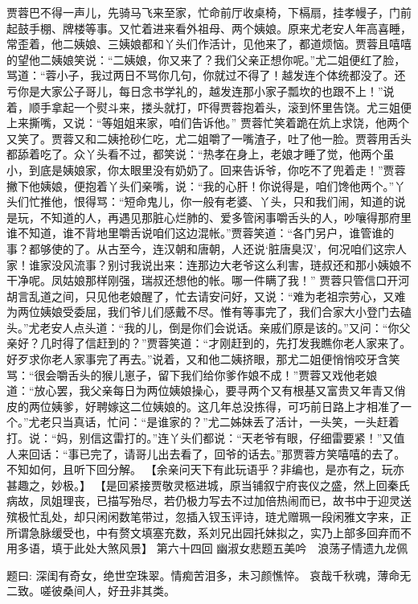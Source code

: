 \documentclass[12pt,oneside]{book}
\begin{document}
贾蓉巴不得一声儿，先骑马飞来至家，忙命前厅收桌椅，下槅扇，挂孝幔子，门前起鼓手棚、牌楼等事。又忙着进来看外祖母、两个姨娘。原来尤老安人年高喜睡，常歪着，他二姨娘、三姨娘都和丫头们作活计，见他来了，都道烦恼。贾蓉且嘻嘻的望他二姨娘笑说：“二姨娘，你又来了？我们父亲正想你呢。”尤二姐便红了脸，骂道：“蓉小子，我过两日不骂你几句，你就过不得了！越发连个体统都没了。还亏你是大家公子哥儿，每日念书学礼的，越发连那小家子瓢坎的也跟不上！”说着，顺手拿起一个熨斗来，搂头就打，吓得贾蓉抱着头，滚到怀里告饶。尤三姐便上来撕嘴，又说：“等姐姐来家，咱们告诉他。”
贾蓉忙笑着跪在炕上求饶，他两个又笑了。贾蓉又和二姨抢砂仁吃，尤二姐嚼了一嘴渣子，吐了他一脸。贾蓉用舌头都舔着吃了。众丫头看不过，都笑说：“热孝在身上，老娘才睡了觉，他两个虽小，到底是姨娘家，你太眼里没有奶奶了。回来告诉爷，你吃不了兜着走！”贾蓉撇下他姨娘，便抱着丫头们亲嘴，说：“我的心肝！你说得是，咱们馋他两个。”丫头们忙推他，恨得骂：“短命鬼儿，你一般有老婆、丫头，只和我们闹，知道的说是玩，不知道的人，再遇见那脏心烂肺的、爱多管闲事嚼舌头的人，吵嚷得那府里谁不知道，谁不背地里嚼舌说咱们这边混帐。”贾蓉笑道：“各门另户，谁管谁的事？都够使的了。从古至今，连汉朝和唐朝，人还说‘脏唐臭汉’，何况咱们这宗人家！谁家没风流事？别讨我说出来：连那边大老爷这么利害，琏叔还和那小姨娘不干净呢。凤姑娘那样刚强，瑞叔还想他的帐。哪一件瞒了我！”
贾蓉只管信口开河胡言乱道之间，只见他老娘醒了，忙去请安问好，又说：“难为老祖宗劳心，又难为两位姨娘受委屈，我们爷儿们感戴不尽。惟有等事完了，我们合家大小登门去磕头。”尤老安人点头道：“我的儿，倒是你们会说话。亲戚们原是该的。”又问：“你父亲好？几时得了信赶到的？”贾蓉笑道：“才刚赶到的，先打发我瞧你老人家来了。好歹求你老人家事完了再去。”说着，又和他二姨挤眼，那尤二姐便悄悄咬牙含笑骂：“很会嚼舌头的猴儿崽子，留下我们给你爹作娘不成！”贾蓉又戏他老娘道：“放心罢，我父亲每日为两位姨娘操心，要寻两个又有根基又富贵又年青又俏皮的两位姨爹，好聘嫁这二位姨娘的。这几年总没拣得，可巧前日路上才相准了一个。”尤老只当真话，忙问：“是谁家的？”尤二姊妹丢了活计，一头笑，一头赶着打。说：“妈，别信这雷打的。”连丫头们都说：“天老爷有眼，仔细雷要紧！”又值人来回话：“事已完了，请哥儿出去看了，回爷的话去。”那贾蓉方笑嘻嘻的去了。不知如何，且听下回分解。
【余亲问天下有此玩语乎？非编也，是亦有之，玩亦甚趣之，妙极。】 
【是回紧接贾敬灵柩进城，原当铺叙宁府丧仪之盛，然上回秦氏病故，凤姐理丧，已描写殆尽，若仍极力写去不过加倍热闹而已，故书中于迎灵送殡极忙乱处，却只闲闲数笔带过，忽插入钗玉评诗，琏尤赠珮一段闲雅文字来，正所谓急脉缓受也，中有赘文填塞充数，系刘兄出园托妹拟之，实乃上部多回弃而不用多语，填于此处大煞风景】
第六十四回  幽淑女悲题五美吟　浪荡子情遗九龙佩

题曰:
深闺有奇女，绝世空珠翠。情痴苦泪多，未习颜憔悴。
哀哉千秋魂，薄命无二致。嗟彼桑间人，好丑非其类。
\end{document}
